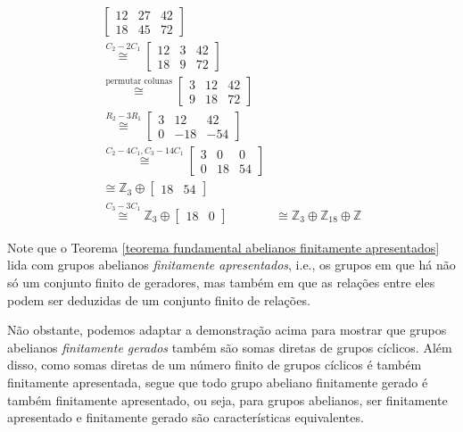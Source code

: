 \documentclass[a4paper,portuguese,11pt,twoside, leqno]{book}
\theoremstyle{definition}
\begin{document}
\begin{align*}
	\begin{bmatrix}
	12 & 27 & 42 \\
	18 & 45 & 72
	\end{bmatrix}& \\ \stackrel{C_2 - 2C_1}{\cong}
	\begin{bmatrix}
	12 & 3 & 42 \\
	18 & 9 & 72
	\end{bmatrix}& \\ \stackrel{\text{permutar colunas}}{\cong}
	\begin{bmatrix}
	3 & 12 & 42 \\
	9 & 18 & 72
	\end{bmatrix}& \\ \stackrel{R_2 - 3R_1}{\cong}
	\begin{bmatrix}
	3 & 12 & 42 \\
	0 & -18 & -54
	\end{bmatrix}& \\ \stackrel{C_2 - 4C_1, C_3 - 14C_1}{\cong}
	\begin{bmatrix}
	3 & 0 & 0 \\
	0 & 18 & 54
	\end{bmatrix}& \\ \stackrel{}{\cong}
	\mathbb{Z}_3\oplus\begin{bmatrix}
	18 & 54
	\end{bmatrix}& \\ \stackrel{C_3 - 3C_1}{\cong}
	\mathbb{Z}_3\oplus\begin{bmatrix}
	18 & 0
	\end{bmatrix}& \cong \mathbb{Z}_3\oplus\mathbb{Z}_{18}\oplus\mathbb{Z}
	\end{align*}
	\par\vspace{0.3cm} Note que o Teorema \eqref{teorema fundamental abelianos finitamente apresentados} lida com grupos abelianos \textit{finitamente apresentados}, i.e., os grupos em que há não só um conjunto finito de geradores, mas também em que as relações entre eles podem ser deduzidas de um conjunto finito de relações.
	\par\vspace{0.3cm} Não obstante, podemos adaptar a demonstração acima para mostrar que grupos abelianos \textit{finitamente gerados} também são somas diretas de grupos cíclicos. Além disso, como somas diretas de um número finito de grupos cíclicos é também finitamente apresentada, segue que todo grupo abeliano finitamente gerado é também finitamente apresentado, ou seja, para grupos abelianos, ser finitamente apresentado e finitamente gerado são características equivalentes.
\end{document}
